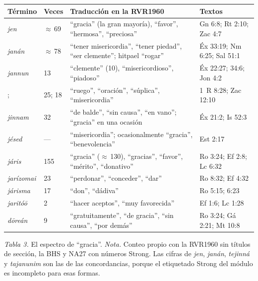 \begin{center}\small\renewcommand{\arraystretch}{1.16}
\begin{tabular}{@{}L{3.6cm}L{1.3cm}L{5.2cm}L{4.4cm}@{}}
\toprule
\textbf{Término} & \textbf{Veces} & \textbf{Traducción en la RVR1960} & \textbf{Textos} \\ \midrule
{} \emph{jen} & $\approx$\,69 & ``gracia'' (la gran mayoría), ``favor'', ``hermosa'', ``preciosa'' & Gn 6:8; Rt 2:10; Zac 4:7 \\
 \emph{janán} & $\approx$\,78 & ``tener misericordia'', ``tener piedad'', ``ser clemente''; hitpael ``rogar'' & Éx 33:19; Nm 6:25; Sal 51:1 \\
 \emph{jannun} & 13 & ``clemente'' (10), ``misericordioso'', ``piadoso'' & Éx 22:27; 34:6; Jon 4:2 \\
;  & 25; 18 & ``ruego'', ``oración'', ``súplica'', ``misericordia'' & 1~R 8:28; Zac 12:10 \\
 \emph{jinnam} & 32 & ``de balde'', ``sin causa'', ``en vano''; ``gracia'' en una ocasión & Éx 21:2; Is 52:3 \\
 \emph{jésed} & --- & ``misericordia''; ocasionalmente ``gracia'', ``benevolencia'' & Est 2:17 \\ \midrule
{} \emph{járis} & 155 & ``gracia'' ($\approx$\,130), ``gracias'', ``favor'', ``mérito'', ``donativo'' & Ro 3:24; Ef 2:8; Lc 6:32 \\
 \emph{jarízomai} & 23 & ``perdonar'', ``conceder'', ``dar'' & Ro 8:32; Ef 4:32 \\
 \emph{járisma} & 17 & ``don'', ``dádiva'' & Ro 5:15; 6:23 \\
 \emph{jaritóō} & 2 & ``hacer aceptos'', ``muy favorecida'' & Ef 1:6; Lc 1:28 \\
 \emph{dōreán} & 9 & ``gratuitamente'', ``de gracia'', ``sin causa'', ``por demás'' & Ro 3:24; Gá 2:21; Mt 10:8 \\
\bottomrule
\end{tabular}\par
{\footnotesize\color{gris}\textit{Tabla 3.} El espectro de ``gracia''. \textit{Nota.} Conteo propio con la RVR1960 sin títulos de sección, la BHS y NA27 con números Strong. Las cifras de \emph{jen}, \emph{janán}, \emph{tejinná} y \emph{tajanunim} son las de las concordancias, porque el etiquetado Strong del módulo es incompleto para esas formas.}
\end{center}

